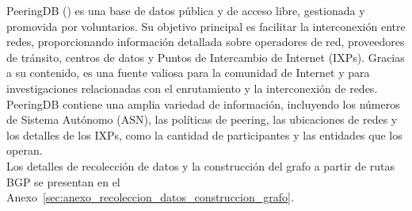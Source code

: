 PeeringDB (\cite{PeeringDB}) es una base de datos pública y de acceso libre, gestionada y promovida por voluntarios. 
Su objetivo principal es facilitar la interconexión entre redes, proporcionando información detallada sobre operadores 
de red, proveedores de tránsito, centros de datos y Puntos de Intercambio de Internet (IXPs). Gracias a su contenido, 
es una fuente valiosa para la comunidad de Internet y para investigaciones relacionadas con el enrutamiento y la 
interconexión de redes. \\

PeeringDB contiene una amplia variedad de información, incluyendo los números de Sistema Autónomo (ASN), las 
políticas de peering, las ubicaciones de redes y los detalles de los IXPs, como la cantidad de participantes 
y las entidades que los operan. \\

Los detalles de recolección de datos y la construcción del grafo a partir de rutas BGP se presentan en el Anexo~\ref{sec:anexo_recoleccion_datos_construccion_grafo}.
